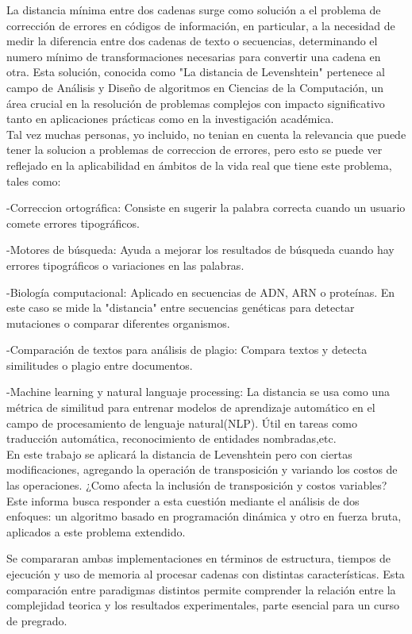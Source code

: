 La distancia mínima entre dos cadenas surge como solución a el problema de corrección de errores en códigos de información, en particular, a la necesidad de medir la diferencia entre dos cadenas de texto o secuencias, determinando el numero mínimo de transformaciones 
necesarias para convertir una cadena en otra. 
Esta solución, conocida como "La distancia de Levenshtein" pertenece al campo de Análisis y Diseño de algoritmos en Ciencias de la Computación, un área crucial en la resolución de problemas complejos con impacto significativo tanto en aplicaciones prácticas como en la investigación académica.\\

Tal vez muchas personas, yo incluido, no tenian en cuenta la relevancia  que puede tener la solucion a problemas de correccion de errores, pero esto se puede ver reflejado en la aplicabilidad en ámbitos de la vida real que tiene este problema, tales como:

-Correccion ortográfica: Consiste en sugerir la palabra correcta cuando un usuario 
comete errores tipográficos.

-Motores de búsqueda: Ayuda a mejorar los resultados de búsqueda cuando hay errores
tipográficos o variaciones en las palabras.

-Biología computacional: Aplicado en secuencias de ADN, ARN o proteínas.
En este caso se mide la "distancia" entre secuencias genéticas para detectar mutaciones
o comparar diferentes organismos.

-Comparación de textos para análisis de plagio: Compara textos y detecta
similitudes o plagio entre documentos.

-Machine learning y natural languaje processing: La distancia se usa como una métrica
de similitud para entrenar modelos de aprendizaje automático en el campo de procesamiento
de lenguaje natural(NLP). Útil en tareas como traducción automática,
reconocimiento de entidades nombradas,etc.\\

En este trabajo se aplicará la distancia de Levenshtein pero con ciertas modificaciones,
agregando la operación de transposición y variando los costos de las operaciones.
¿Como afecta la inclusión de transposición y costos variables? Este informa busca 
responder a esta cuestión mediante el análisis de dos enfoques: un algoritmo basado en
programación dinámica y otro en fuerza bruta, aplicados a este problema extendido.

Se compararan ambas implementaciones en términos de estructura, tiempos de ejecución y uso de memoria al procesar cadenas con distintas características.
Esta comparación entre paradigmas distintos permite comprender la relación entre la complejidad teorica y los resultados experimentales, parte esencial para un curso de pregrado. 

